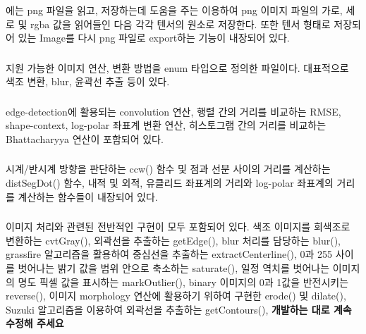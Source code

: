 \documentclass[conference]{IEEEtran}
\begin{document}
\subsubsection{\egLoader}

\egLoader 에는 png 파일을 읽고, 저장하는데 도움을 주는  이용하여 png 이미지 파일의 가로, 세로 및 rgba 값을 읽어들인 다음 각각 텐서의 원소로 저장한다.
또한 \Eigen 텐서 형태로 저장되어 있는 Image를 다시 png 파일로 export하는 기능이 내장되어 있다.

\subsubsection{\egMethods}

 지원 가능한 이미지 연산, 변환 방법을 enum 타입으로 정의한 파일이다.
대표적으로 색조 변환, blur, 윤곽선 추출 등이 있다.

\subsubsection{\egMath}

 edge-detection에 활용되는 convolution 연산, 행렬 간의 거리를 비교하는 RMSE, shape-context, log-polar 좌표계 변환 연산, 히스토그램 간의 거리를 비교하는 Bhattacharyya 연산이 포함되어 있다.

\subsubsection{\egGeometry}

 시계/반시계 방향을 판단하는 ccw() 함수 및 점과 선분 사이의 거리를 계산하는 distSegDot() 함수, 내적 및 외적, 유클리드 좌표계의 거리와 log-polar 좌표계의 거리를 계산하는 함수들이 내장되어 있다. 

\subsubsection{\egProcessing}

 이미지 처리와 관련된 전반적인 구현이 모두 포함되어 있다.
색조 이미지를 회색조로 변환하는 cvtGray(),
외곽선을 추출하는 getEdge(),
blur 처리를 담당하는 blur(),
grassfire 알고리즘을 활용하여 중심선을 추출하는 extractCenterline(),
0과 255 사이를 벗어나는 밝기 값을 범위 안으로 축소하는 saturate(),
일정 역치를 벗어나는 이미지의 명도 픽셀 값을 표시하는 markOutlier(),
binary 이미지의 0과 1값을 반전시키는 reverse(),
이미지 morphology 연산에 활용하기 위하여 구현한 erode() 및 dilate(),
Suzuki 알고리즘을 이용하여 외곽선을 추출하는 getContours(),
\textbf{개발하는 대로 계속 수정해 주세요~}
\end{document}
